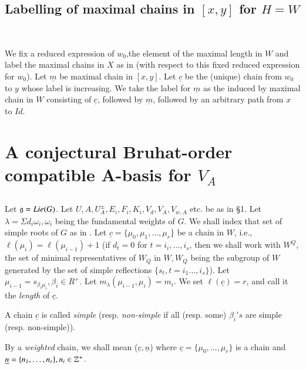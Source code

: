 \setcounter{subsection}{7}
\subsection{Labelling of maximal chains in $[x,y]$ for $H=W$}\label{art9-subsec-2.8}
~

\noindent
 We fix a reduced expression of $w_{0}$,the element of the maximal length in $W$ and label the maximal chains in $X$ as in \cite{art9-keyB-W}(with respect to this fixed reduced expression for $w_{0}$). Let $\underline{m}$ be maximal chain in $[x,y]$. Let $\underline{c}$ be the (unique) chain from  $w_{0}$ to $y$ whose label is increasing. We take the label for $\underline{m}$ as the induced by maximal chain in $W$ consisting of $\underline{c}$, followed by $\underline{m}$, followed by an arbitrary path from $x$ to $Id$.  

\section{A conjectural Bruhat-order compatible A-basis for $V_{A}$}\label{art9-sec-3}

\subsection{}\label{art9-subsec-3.1}
Let $\mathfrak{g} =Lie(G)$. Let $U, A, U_{A}^{\pm}, E_{i}, F_{i}, K_{i}, V_{d}, V_{A}, V_{w,A}$ etc. be as in \S1. Let $\lambda = \Sigma d_{i}\omega_{i}, \omega_{i}$ being the fundamental weights of $G$. We shall index that set of simple roots of $G$ as in \cite{art9-keyB}. Let $\underline{c} = \{\mu_{0},\mu_{1}, \ldots, \mu_{r}\}$ be a chain in $W$, i.e., $\ell(\mu_{i})= \ell(\mu_{i-1}) +1$ (if $d_{t} =0$ for $t=i_{i}, \ldots, i_{s}$, then we shall work with $W^{Q}$, the set of minimal representatives of $W_{Q}$ in $W, W_{Q}$ being the subgroup of $W$ generated by the set of simple reflections $\{s_{t}, t=i_{1} \ldots, i_{s}\}$). Let $\mu_{i-1} = s_{\beta_{i}\mu_{i}}, \beta_{i} \in R^{+}$. Let $m_{\lambda}(\mu_{i-1}, \mu_{i}) =m_{i}$. We set $\ell(\underline{c}) = r$, and call it the \textit{length} of $\underline{c}$. 

\setcounter{equation}{1}
\begin{definition}\label{art9-definition-3.2}
A chain $\underline{c}$ is called \textit{simple} (resp. \textit{non-simple} if all (resp. some) $\beta_{i}'s$ are simple (resp. non-simple)).
\end{definition}

\begin{definition}\label{art9-definition-3.3}
By a \textit{weighted} chain, we shall mean ($\underline{c}, \underline{n}$) where $\underline{c}= \{ \mu_{0}, \ldots, \mu_{r}\}$ is a chain and $\underline{n} = \{ n_{1}, \ldots, n_{r}\}, n_{i} \in \mathbb{Z}^{+}$.
\end{definition}


